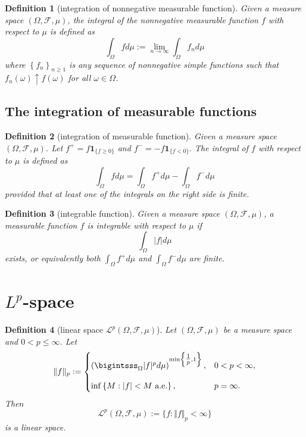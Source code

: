 \documentclass{report}
\newtheorem{definition}{Definition}[section]
\theoremstyle{nonumberplain}
\begin{document}
\begin{definition}[integration of nonnegative measurable function]
	Given a measure space $(\Omega, \mathcal{F},\mu)$, the integral of the nonnegative measurable function $f$ with respect to $\mu$
	is defined as
	\[
	\int_\Omega fd\mu:=\lim _{n \rightarrow \infty} \int_\Omega f_{n} d \mu
	\]
	where $\left\{f_{n}\right\}_{n \geq 1}$ is any sequence of nonnegative simple functions such that $f_{n}(\omega) \uparrow f(\omega)$ for all $\omega\in\Omega$.
\end{definition}

\subsection{The integration of measurable functions}
\begin{definition}[integration of measurable function]
	Given a measure space $(\Omega, \mathcal{F},\mu)$. Let $f^{+}=f \mathbf{1}_{\{f \geq 0\}}$ and $f^{-}=-f \mathbf{1}_{\{f<0\}} .$ The integral of $f$ with respect to $\mu$ is defined as
	\[
	\int_\Omega f d \mu=\int_\Omega f^{+} d \mu-\int_\Omega f^{-} d \mu
	\]
	provided that at least one of the integrals on the right side is finite.
\end{definition}

\begin{definition}[integrable function]
	Given a measure space $(\Omega, \mathcal{F},\mu)$, a measurable function $f$ is integrable with respect to $\mu$ if
	\[
	\int_\Omega |f| d \mu
	\]
	exists, or equivalently both $\int_\Omega f^+ d \mu$ and $\int_\Omega f^- d \mu$ are finite.
\end{definition}

\section{$L^p$-space}

\begin{definition}[linear space $\mathcal{L}^p(\Omega, \mathcal{F}, \mu)$] Let $(\Omega, \mathcal{F}, \mu)$ be a measure space and $0< p \leq\infty$. Let
\[
	\Vert f\Vert_p:=
	\begin{cases}
		\left(\bigintsss_\Omega |f|^pd\mu\right)^{\min\left\{\tfrac{1}{p},1\right\}},&0< p< \infty,\\[10pt]
		\inf \left\{M: |f|<M\text{ a.e.}\right\},&p=\infty.
	\end{cases}
\]
Then 
\[
\mathcal{L}^{p}(\Omega, \mathcal{F}, \mu):=\{f:\Vert f\Vert_p<\infty\}
\]
is a linear space.

\end{definition}
\end{document}
